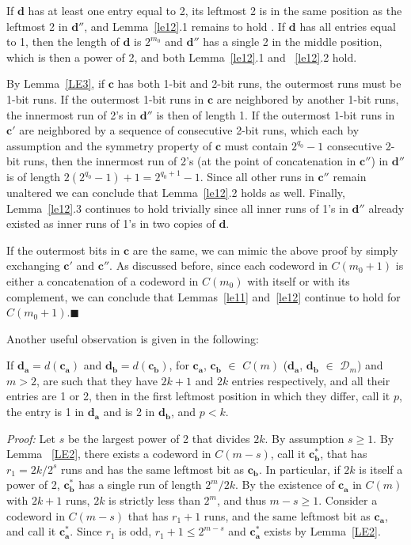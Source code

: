 If $\mathbf{d}$ has at least one entry equal to 2, its leftmost 2
is in the same position as the leftmost 2 in $\mathbf{d''}$, and
Lemma~\ref{le12}.1 remains to hold . If $\mathbf{d}$ has all
entries equal to 1, then the length of $\mathbf{d}$ is $2^{m_0}$
and $\mathbf{d''}$ has a single 2 in the middle position, which is
then a power of 2, and both Lemma~\ref{le12}.1 and ~\ref{le12}.2
hold.

By Lemma~\ref{LE3}, if $\mathbf{c}$ has both 1-bit and 2-bit runs,
the outermost runs must be 1-bit runs. If the outermost 1-bit runs
in $\mathbf{c}$ are neighbored by another 1-bit runs, the
innermost run of 2's in $\mathbf{d''}$ is then of length 1. If the
outermost 1-bit runs in $\mathbf{c'}$ are neighbored by a sequence
of consecutive 2-bit runs, which each by assumption and the
symmetry property of $\mathbf{c}$ must contain $2^{q_0}-1$
consecutive 2-bit runs, then the innermost run of 2's (at the
point of concatenation in $\mathbf{c''}$) in $\mathbf{d''}$ is of
length $2(2^{q_0}-1)+1=2^{q_0+1}-1$. Since all other runs in
$\mathbf{c''}$ remain unaltered we can conclude that
Lemma~\ref{le12}.2 holds as well. Finally, Lemma~\ref{le12}.3
continues to hold trivially since all inner runs of 1's in
$\mathbf{d''}$ already existed as inner runs of 1's in two copies
of $\mathbf{d}$.

If the outermost bits in $\mathbf{c}$ are the same, we can mimic
the above proof by simply exchanging $\mathbf{c'}$ and
$\mathbf{c''}$. As discussed before, since each codeword in
$C(m_0+1)$ is either a concatenation of a codeword in $C(m_0)$
with itself or with its complement, we can conclude that
Lemmas~\ref{le11} and~\ref{le12} continue to hold for
$C(m_0+1)$.\hfill$\blacksquare$

Another useful observation is given in the following:
\begin{lemma}\label{le14} If $\mathbf{d_a}=d(\mathbf{c_a})$ and $\mathbf{d_b}=d(\mathbf{c_b})$,
for $\mathbf{c_a}$, $\mathbf{c_b}$ $\in$ $C(m)$ ($\mathbf{d_a}$,
$\mathbf{d_b}$ $\in$ $\mathcal{D}_m$) and $m>2$, are such that
they have $2k+1$ and $2k$ entries respectively, and all their
entries are 1 or 2, then in the first leftmost position in which
they differ, call it $p$, the entry is 1 in $\mathbf{d_a}$ and is
2 in $\mathbf{d_b}$, and $p<k$.
\end{lemma}

\noindent \textit{Proof:} Let $s$ be the largest power of 2 that
divides $2k$. By assumption $s \geq 1$. By Lemma ~\ref{LE2}, there
exists a codeword in $C(m-s)$, call it $\mathbf{c_b^{*}}$, that
has $r_1=2k/2^s$ runs and has the same leftmost bit as
$\mathbf{c_b}$. In particular, if $2k$ is itself a power of 2,
$\mathbf{c_b^{*}}$ has a single run of length $2^m/{2k}$. By the
existence of $\mathbf{c_a}$ in $C(m)$ with $2k+1$ runs, $2k$ is
strictly less than $2^m$, and thus $m-s \geq 1$. Consider a
codeword in $C(m-s)$ that has $r_1+1$ runs, and the same leftmost
bit as $\mathbf{c_a}$, and call it $\mathbf{c_a^{*}}$. Since $r_1$
is odd, $r_1+1 \leq 2^{m-s}$ and $\mathbf{c_a^{*}}$ exists by
Lemma~\ref{LE2}.

